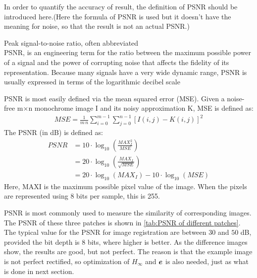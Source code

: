 In order to quantify the accuracy of result, the definition of PSNR should be introduced here.(Here the formula of PSNR is used but it doesn't have the meaning for noise, so that the result is not an actual PSNR.)

\begin{definition}\label{def:PSNR}
	Peak signal-to-noise ratio, often abbreviated \\ PSNR, is an engineering term for the ratio between the maximum possible power of a signal and the power of corrupting noise that affects the fidelity of its representation. Because many signals have a 
	very wide dynamic range, PSNR is usually expressed in terms 
	of the logarithmic decibel scale \cite{PeakSignaltonoiseRatio2020}
	
	PSNR is most easily defined via the mean squared error (MSE). Given a noise-free m×n monochrome image I and its noisy approximation K, MSE is defined as:
	\begin{align}
		\mathit{MSE} = \frac{1}{m\,n}\sum_{i=0}^{m-1}\sum_{j=0}^{n-1} [I(i,j) - K(i,j)]^2
	\end{align}
	The PSNR (in dB) is defined as:
	\begin{align}
	\mathit{PSNR} &= 10 \cdot \log_{10} \left( \frac{\mathit{MAX}_I^2}{\mathit{MSE}} \right)\nonumber \\ 
	&= 20 \cdot \log_{10} \left( \frac{\mathit{MAX}_I}{\sqrt{\mathit{MSE}}} \right)\nonumber \\ 
	&= 20 \cdot \log_{10} \left( {\mathit{MAX}_I} \right) - 10 \cdot \log_{10} \left( {{\mathit{MSE}}} \right)
	\end{align}
	Here, MAXI is the maximum possible pixel value of the image. When the pixels are represented using 8 bits per sample, this is 255.
\end{definition}

PSNR is most commonly used to measure the similarity of corresponding images. The PSNR of these three patches is shown in \cref{tab:PSNR of different patches}. The typical value for the PSNR for image registration are between $30$ and $50$ dB, provided the bit depth is $8$ bits, where higher is better. As the difference images show, the results are good, but not perfect. The reason is that the example image is not perfect rectified, so optimization of $H_\infty$ and $\boldsymbol{e}$ is also needed, just as what is done in next section.


